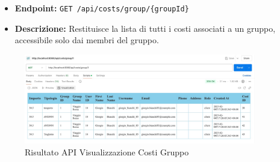 \begin{itemize}
    \item \textbf{Endpoint:} \texttt{GET /api/costs/group/\{groupId\}}
    \item \textbf{Descrizione:} Restituisce la lista di tutti i costi associati a un gruppo, accessibile solo dai membri del gruppo.
\end{itemize}

\begin{figure}[h!]
    \centering
    \includegraphics[width=0.9\textwidth]{images/getGroupCosts.jpeg}
    \caption{Risultato API Visualizzazione Costi Gruppo}
    \label{fig:api_view_group_costs}
\end{figure}
